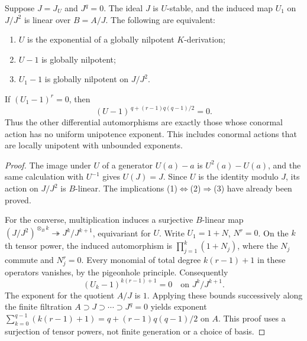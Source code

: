 \begin{theorem}
\label{C:conormal}
Suppose $J=J_U$ and $J^q=0$. The ideal $J$ is $U$-stable, and the induced map $U_1$ on $J/J^2$ is linear over $B=A/J$. The following are equivalent:
\begin{enumerate}
\item $U$ is the exponential of a globally nilpotent $K$-derivation;
\item $U-1$ is globally nilpotent;
\item $U_1-1$ is globally nilpotent on $J/J^2$.
\end{enumerate}
If $(U_1-1)^r=0$, then
\[
(U-1)^{\,q+(r-1)q(q-1)/2}=0.
\]
Thus the other differential automorphisms are exactly those whose conormal action has no uniform unipotence exponent. This includes conormal actions that are locally unipotent with unbounded exponents.
\end{theorem}
\begin{proof}
The image under $U$ of a generator $U(a)-a$ is $U^2(a)-U(a)$, and the same calculation with $U^{-1}$ gives $U(J)=J$. Since $U$ is the identity modulo $J$, its action on $J/J^2$ is $B$-linear. The implications (1)$\Leftrightarrow$(2)$\Rightarrow$(3) have already been proved.

For the converse, multiplication induces a surjective $B$-linear map
$(J/J^2)^{\otimes_B k}\twoheadrightarrow J^k/J^{k+1}$, equivariant for $U$. Write $U_1=1+N$, $N^r=0$. On the $k$th tensor power, the induced automorphism is $\prod_{j=1}^k(1+N_j)$, where the $N_j$ commute and $N_j^r=0$. Every monomial of total degree $k(r-1)+1$ in these operators vanishes, by the pigeonhole principle. Consequently
\[
(U_k-1)^{k(r-1)+1}=0\quad\text{on }J^k/J^{k+1}.
\]
The exponent for the quotient $A/J$ is $1$. Applying these bounds successively along the finite filtration $A\supset J\supset\cdots\supset J^q=0$ yields exponent
$\sum_{k=0}^{q-1}(k(r-1)+1)=q+(r-1)q(q-1)/2$ on $A$. This proof uses a surjection of tensor powers, not finite generation or a choice of basis.
\end{proof}

